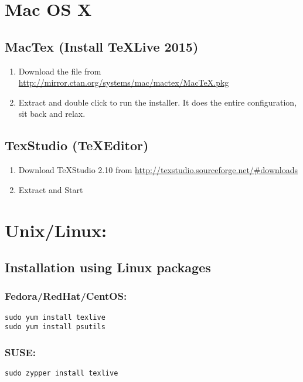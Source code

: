 \documentclass[times,twoside,11pt]{article}
\begin{document}
\section*{Mac OS X}
\subsection*{MacTex (Install \TeX Live 2015)}
\begin{enumerate}
\item	
	Download the file from 
	\url{http://mirror.ctan.org/systems/mac/mactex/MacTeX.pkg}
\item	
	Extract and double click to run the installer. It does the entire 
	configuration, sit back and relax.
\end{enumerate}

\subsection*{TexStudio (\TeX Editor)}
\begin{enumerate}
\item	
	Download \TeX Studio 2.10 from 
	\url{http://texstudio.sourceforge.net/\#downloads}
 
\item
	Extract and Start
\end{enumerate}


\section*{Unix/Linux:}

\subsection*{Installation using Linux packages} 
\subsubsection*{Fedora/RedHat/CentOS:}
\begin{lstlisting}[style=shell]
sudo yum install texlive 
sudo yum install psutils 
\end{lstlisting}


\subsubsection*{SUSE:}
\begin{lstlisting}[style=shell]
sudo zypper install texlive
\end{lstlisting}
\end{document}
